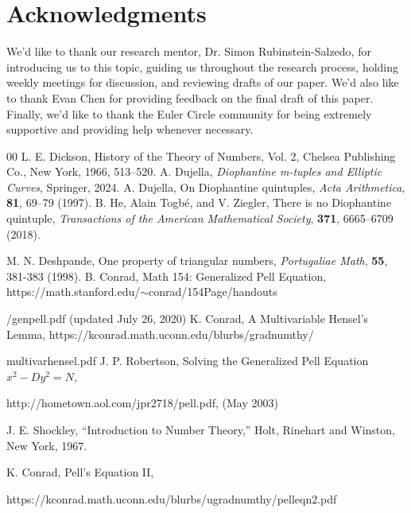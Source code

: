 \documentclass[12pt]{amsart}
\theoremstyle{theorem}
\theoremstyle{definition}
\theoremstyle{plain}
\begin{document}
\section{Acknowledgments}
We'd like to thank our research mentor, Dr. Simon Rubinstein-Salzedo, for introducing us to this topic, guiding us throughout the research process, holding weekly meetings for discussion, and reviewing drafts of our paper. We'd also like to thank Evan Chen for providing feedback on the final draft of this paper. Finally, we'd like to thank the Euler Circle community for being extremely supportive and providing help whenever necessary.


\begin{thebibliography}{00}
 L. E. Dickson, History of the Theory of Numbers, Vol. 2, Chelsea Publishing Co., New York, 1966, 513–520.
 A. Dujella, \emph{Diophantine m-tuples and Elliptic Curves}, Springer, 2024.
 A. Dujella, On Diophantine quintuples, \emph{Acta Arithmetica}, \textbf{81}, 69–79 (1997).
 B. He, Alain Togbé, and V. Ziegler, There is no Diophantine quintuple, \emph{Transactions of the American Mathematical Society}, \textbf{371}, 6665–6709 (2018).

 M. N. Deshpande, One property of triangular numbers, \emph{Portugaliae Math}, \textbf{55}, 381-383 (1998).
 B. Conrad, Math 154: Generalized Pell Equation,
https://math.stanford.edu/$\sim$conrad/154Page/handouts

/genpell.pdf 
(updated July 26, 2020)
 K. Conrad, A Multivariable Hensel's Lemma,
https://kconrad.math.uconn.edu/blurbs/gradnumthy/

multivarhensel.pdf
 J. P. Robertson, Solving the Generalized Pell Equation $x^2 - Dy^2 = N$,

http://hometown.aol.com/jpr2718/pell.pdf, (May 2003)

 J. E. Shockley, “Introduction to Number Theory,” Holt, Rinehart and Winston, New York, 1967.

 K. Conrad, Pell's Equation II,

https://kconrad.math.uconn.edu/blurbs/ugradnumthy/pelleqn2.pdf
\end{thebibliography}
\end{document}
